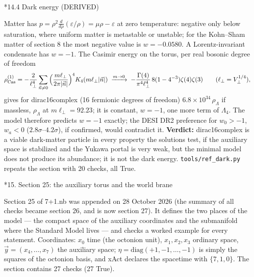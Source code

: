 \documentclass[10pt,a4paper]{article}
\makeatletter
\renewcommand\section{\@startsection{section}{1}{\z@}{-3.5ex \@plus -1ex \@minus -.2ex}{2.3ex \@plus.2ex}{\normalfont\Large\bfseries\raggedright}}
\renewcommand\subsection{\@startsection{subsection}{2}{\z@}{-3.25ex\@plus -1ex \@minus -.2ex}{1.5ex \@plus .2ex}{\normalfont\large\bfseries\raggedright}}
\makeatother
\begin{document}
\subsection*{14.4 Dark energy (DERIVED)}
Matter has $p=\rho^2\frac d{d\rho}(\varepsilon/\rho)=\mu\rho-\varepsilon$ at zero temperature: negative only below saturation, where uniform matter is metastable or unstable; for the Kohn–Sham matter of section 8 the most negative value is $w=-0.0580$. A Lorentz-invariant condensate has $w=-1$. The Casimir energy on the torus, per real bosonic degree of freedom
\begin{equation*}
\rho_{\rm Cas}^{(1)}=-\frac2{\ell_\perp^4}\sum_{\vec n\ne0}\Big(\frac{m\ell_\perp}{2\pi|\vec n|}\Big)^4K_4(m\ell_\perp|\vec n|)\;\xrightarrow{m\to0}\;-\frac{\Gamma(4)}{\pi^4\ell_\perp^4}\,8(1-4^{-3})\zeta(4)\zeta(3)\qquad(\ell_\perp=V_\perp^{1/4}),
\end{equation*}
gives for dirac16complex (16 fermionic degrees of freedom) $6.8\times10^{34}\,\rho_\Lambda$ if massless, $\rho_\Lambda$ at $m\ell_\perp=92.23$; it is constant, $w=-1$, one more term of $\Lambda_4$. The model therefore predicts $w=-1$ exactly; the DESI DR2 preference for $w_0>-1$, $w_a<0$ ($2.8\sigma$–$4.2\sigma$), if confirmed, would contradict it. \textbf{Verdict:} dirac16complex is a viable dark-matter particle in every property the solutions test, if the auxiliary space is stabilized and the Yukawa portal is very weak, but the minimal model does not produce its abundance; it is not the dark energy. \texttt{tools/\allowbreak{}ref\_\allowbreak{}dark.py} repeats the section with 20 checks, all True.

\section*{15. Section 25: the auxiliary torus and the world brane}
Section 25 of 7+1.nb was appended on 28 October 2026 (the summary of all checks became section 26, and is now section 27). It defines the two places of the model — the compact space of the auxiliary coordinates and the submanifold where the Standard Model lives — and checks a worked example for every statement. Coordinates: $x_0$ time (the octonion unit), $x_1,x_2,x_3$ ordinary space, $\vec y=(x_4,\dots,x_7)$ the auxiliary space; $\eta=\mathrm{diag}(+1,-1,\dots,-1)$ is simply the squares of the octonion basis, and xAct declares the spacetime with $\{7,1,0\}$. The section contains 27 checks (27 True).
\end{document}
